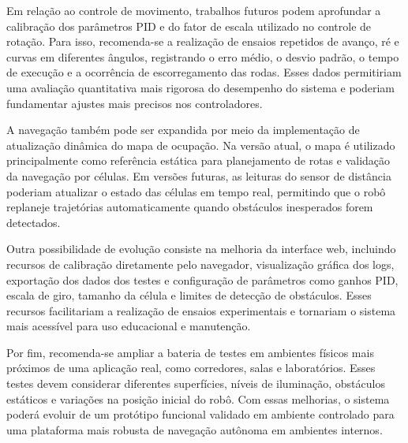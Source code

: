 \documentclass[	12pt, Times, openright, twoside, a4paper, english, brazil]{abntex2}
\begin{document}
Em relação ao controle de movimento, trabalhos futuros podem aprofundar a calibração dos parâmetros PID e do fator de escala utilizado no controle de rotação. Para isso, recomenda-se a realização de ensaios repetidos de avanço, ré e curvas em diferentes ângulos, registrando o erro médio, o desvio padrão, o tempo de execução e a ocorrência de escorregamento das rodas. Esses dados permitiriam uma avaliação quantitativa mais rigorosa do desempenho do sistema e poderiam fundamentar ajustes mais precisos nos controladores.

A navegação também pode ser expandida por meio da implementação de atualização dinâmica do mapa de ocupação. Na versão atual, o mapa é utilizado principalmente como referência estática para planejamento de rotas e validação da navegação por células. Em versões futuras, as leituras do sensor de distância poderiam atualizar o estado das células em tempo real, permitindo que o robô replaneje trajetórias automaticamente quando obstáculos inesperados forem detectados.

Outra possibilidade de evolução consiste na melhoria da interface web, incluindo recursos de calibração diretamente pelo navegador, visualização gráfica dos logs, exportação dos dados dos testes e configuração de parâmetros como ganhos PID, escala de giro, tamanho da célula e limites de detecção de obstáculos. Esses recursos facilitariam a realização de ensaios experimentais e tornariam o sistema mais acessível para uso educacional e manutenção.

Por fim, recomenda-se ampliar a bateria de testes em ambientes físicos mais próximos de uma aplicação real, como corredores, salas e laboratórios. Esses testes devem considerar diferentes superfícies, níveis de iluminação, obstáculos estáticos e variações na posição inicial do robô. Com essas melhorias, o sistema poderá evoluir de um protótipo funcional validado em ambiente controlado para uma plataforma mais robusta de navegação autônoma em ambientes internos.

% 


%
%

\end{document}
